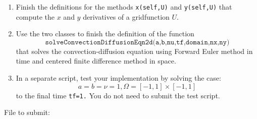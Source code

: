 \documentclass[11pt]{article}
\begin{document}
 
\begin{enumerate}
\item Finish the definitions for the methods \texttt{x(self,U)} and \texttt{y(self,U)} that compute the $x$ and $y$ derivatives of a gridfunction $U$.

\item Use the two classes to finish the definition of the function\\
  $$
  \texttt{solveConvectionDiffusionEqn2d(a,b,nu,tf,domain,nx,ny)}
  $$
  that solves the convection-diffusion equation using Forward Euler method in time and centered finite difference method in space.

\item In a separate script, test your implementation by solving the case:
  $$
  a=b=\nu=1, \Omega=[-1,1]\times[-1,1]
  $$
  to the final time \texttt{tf=1.}
  You do not need to submit the test script.

\end{enumerate}

File to submit: 
\end{document}
